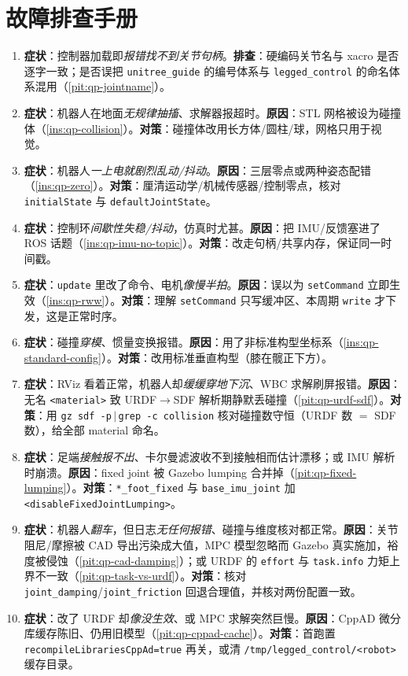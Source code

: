 \section*{故障排查手册}
\begin{enumerate}
  \item \textbf{症状}：控制器加载即\emph{报错找不到关节句柄}。\textbf{排查}：硬编码关节名与 xacro 是否逐字一致；是否误把 \texttt{unitree\_guide} 的编号体系与 \texttt{legged\_control} 的命名体系混用（\cref{pit:qp-jointname}）。
  \item \textbf{症状}：机器人在地面\emph{无规律抽搐}、求解器报超时。\textbf{原因}：STL 网格被设为碰撞体（\cref{ins:qp-collision}）。\textbf{对策}：碰撞体改用长方体/圆柱/球，网格只用于视觉。
  \item \textbf{症状}：机器人\emph{一上电就剧烈乱动/抖动}。\textbf{原因}：三层零点或两种姿态配错（\cref{ins:qp-zero}）。\textbf{对策}：厘清运动学/机械传感器/控制零点，核对 \texttt{initialState} 与 \texttt{defaultJointState}。
  \item \textbf{症状}：控制环\emph{间歇性失稳/抖动}，仿真时尤甚。\textbf{原因}：把 IMU/反馈塞进了 ROS 话题（\cref{ins:qp-imu-no-topic}）。\textbf{对策}：改走句柄/共享内存，保证同一时间戳。
  \item \textbf{症状}：\texttt{update} 里改了命令、电机\emph{像慢半拍}。\textbf{原因}：误以为 \texttt{setCommand} 立即生效（\cref{ins:qp-rww}）。\textbf{对策}：理解 \texttt{setCommand} 只写缓冲区、本周期 \texttt{write} 才下发，这是正常时序。
  \item \textbf{症状}：碰撞\emph{穿模}、惯量变换报错。\textbf{原因}：用了非标准构型坐标系（\cref{ins:qp-standard-config}）。\textbf{对策}：改用标准垂直构型（膝在髋正下方）。
  \item \textbf{症状}：RViz 看着正常，机器人却\emph{缓缓穿地下沉}、WBC 求解刷屏报错。\textbf{原因}：无名 \texttt{<material>} 致 URDF$\to$SDF 解析期静默丢碰撞（\cref{pit:qp-urdf-sdf}）。\textbf{对策}：用 \texttt{gz sdf -p}$\,|\,$\texttt{grep -c collision} 核对碰撞数守恒（URDF 数 $=$ SDF 数），给全部 material 命名。
  \item \textbf{症状}：足端\emph{接触报不出}、卡尔曼滤波收不到接触相而估计漂移；或 IMU 解析时崩溃。\textbf{原因}：fixed joint 被 Gazebo lumping 合并掉（\cref{pit:qp-fixed-lumping}）。\textbf{对策}：\texttt{*\_foot\_fixed} 与 \texttt{base\_imu\_joint} 加 \texttt{<disableFixedJointLumping>}。
  \item \textbf{症状}：机器人\emph{翻车}，但日志\emph{无任何报错}、碰撞与维度核对都正常。\textbf{原因}：关节阻尼/摩擦被 CAD 导出污染成大值，MPC 模型忽略而 Gazebo 真实施加，裕度被侵蚀（\cref{pit:qp-cad-damping}）；或 URDF 的 \texttt{effort} 与 \texttt{task.info} 力矩上界不一致（\cref{pit:qp-task-vs-urdf}）。\textbf{对策}：核对 \texttt{joint\_damping}/\allowbreak\texttt{joint\_friction} 回退合理值，并核对两份配置一致。
  \item \textbf{症状}：改了 URDF 却\emph{像没生效}、或 MPC 求解突然巨慢。\textbf{原因}：CppAD 微分库缓存陈旧、仍用旧模型（\cref{pit:qp-cppad-cache}）。\textbf{对策}：首跑置 \texttt{recompileLibrariesCppAd=true} 再关，或清 \texttt{/\allowbreak tmp/\allowbreak legged\_control/\allowbreak <robot>} 缓存目录。
\end{enumerate}
